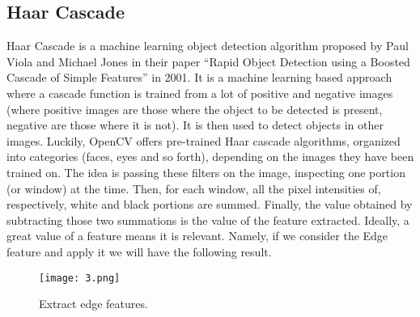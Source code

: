 \documentclass{article}
\begin{document}
\subsection{Haar Cascade}
\par{Haar Cascade is a machine learning object detection algorithm proposed by Paul Viola and Michael Jones in their paper “Rapid Object Detection using a Boosted Cascade of Simple Features” in 2001. It is a machine learning based approach where a cascade function is trained from a lot of positive and negative images (where positive images are those where the object to be detected is present, negative are those where it is not). It is then used to detect objects in other images. Luckily, OpenCV offers pre-trained Haar cascade algorithms, organized into categories (faces, eyes and so forth), depending on the images they have been trained on. The idea is passing these filters on the image, inspecting one portion (or window) at the time. Then, for each window, all the pixel intensities of, respectively, white and black portions are summed. Finally, the value obtained by subtracting those two summations is the value of the feature extracted. Ideally, a great value of a feature means it is relevant. Namely, if we consider the Edge feature and apply it we will have the following result.
\begin{figure}[H]
    \centering
    \texttt{[image: 3.png]}
    \caption{ Extract edge features.}
    \label{simulationfigure}
\end{figure}
}
\end{document}
